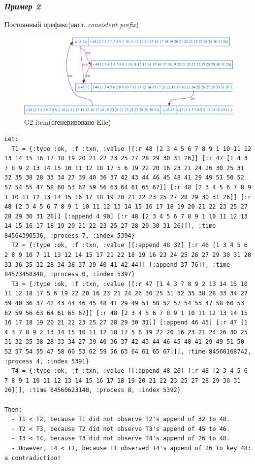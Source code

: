 \documentclass[12pt,  openany]{book}
\begin{document}
\subsubsection{\textit{Пример 2}}
Постоянный префикс(англ.  \textit{consistent prefix})
\begin{figure}[H]
  \includegraphics[width=\textwidth]{prefix/7.png}
  \caption{G2-item(сгенерировано Elle)}
\end{figure}
\par
\begin{lstlisting}[caption={Пояснение к G2-item аномалии (сгенерировано Elle)}]
Let:
  T1 = {:type :ok, :f :txn, :value [[:r 48 [2 3 4 5 6 7 8 9 1 10 11 12 13 14 15 16 17 18 19 20 21 22 23 25 27 28 29 30 31 26]] [:r 47 [1 4 3 7 8 9 2 13 14 15 10 11 12 18 17 5 6 19 22 20 16 23 21 24 26 30 25 31 32 35 38 28 33 34 27 39 40 36 37 42 43 44 46 45 48 41 29 49 51 50 52 57 54 55 47 58 60 53 62 59 56 63 64 61 65 67]] [:r 48 [2 3 4 5 6 7 8 9 1 10 11 12 13 14 15 16 17 18 19 20 21 22 23 25 27 28 29 30 31 26]] [:r 48 [2 3 4 5 6 7 8 9 1 10 11 12 13 14 15 16 17 18 19 20 21 22 23 25 27 28 29 30 31 26]] [:append 4 90] [:r 48 [2 3 4 5 6 7 8 9 1 10 11 12 13 14 15 16 17 18 19 20 21 22 23 25 27 28 29 30 31 26]]], :time 84564390536, :process 7, :index 5394}
  T2 = {:type :ok, :f :txn, :value [[:append 48 32] [:r 46 [1 3 4 5 6 2 8 9 10 7 11 13 12 14 15 17 21 22 18 19 16 23 24 25 26 27 29 30 31 20 33 36 35 32 28 34 38 37 39 40 41 42 44]] [:append 37 76]], :time 84573458348, :process 0, :index 5397}
  T3 = {:type :ok, :f :txn, :value [[:r 47 [1 4 3 7 8 9 2 13 14 15 10 11 12 18 17 5 6 19 22 20 16 23 21 24 26 30 25 31 32 35 38 28 33 34 27 39 40 36 37 42 43 44 46 45 48 41 29 49 51 50 52 57 54 55 47 58 60 53 62 59 56 63 64 61 65 67]] [:r 48 [2 3 4 5 6 7 8 9 1 10 11 12 13 14 15 16 17 18 19 20 21 22 23 25 27 28 29 30 31]] [:append 46 45] [:r 47 [1 4 3 7 8 9 2 13 14 15 10 11 12 18 17 5 6 19 22 20 16 23 21 24 26 30 25 31 32 35 38 28 33 34 27 39 40 36 37 42 43 44 46 45 48 41 29 49 51 50 52 57 54 55 47 58 60 53 62 59 56 63 64 61 65 67]]], :time 84560168742, :process 4, :index 5391}
  T4 = {:type :ok, :f :txn, :value [[:append 48 26] [:r 48 [2 3 4 5 6 7 8 9 1 10 11 12 13 14 15 16 17 18 19 20 21 22 23 25 27 28 29 30 31 26]]], :time 84560623148, :process 8, :index 5392}

Then:
  - T1 < T2, because T1 did not observe T2's append of 32 to 48.
  - T2 < T3, because T2 did not observe T3's append of 45 to 46.
  - T3 < T4, because T3 did not observe T4's append of 26 to 48.
  - However, T4 < T1, because T1 observed T4's append of 26 to key 48: a contradiction!
\end{lstlisting}
\end{document}
